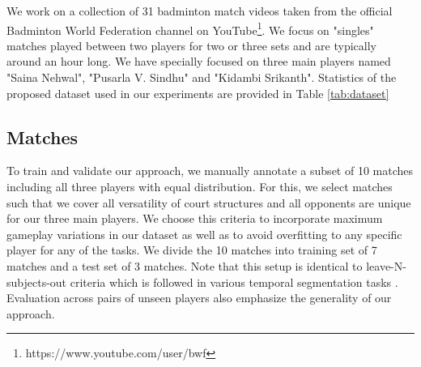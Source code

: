 \documentclass[runningheads,a4paper]{llncs}
\begin{document}
We work on a collection of 31 badminton match videos
taken from the official Badminton World Federation channel on YouTube\footnote{https://www.youtube.com/user/bwf}. We focus on "singles" matches played between two players for two or three sets and are typically around an hour long. We have specially focused on three main players named "Saina Nehwal", "Pusarla V. Sindhu" and "Kidambi Srikanth". Statistics of the proposed dataset used in our experiments are provided in Table \ref{tab:dataset}
\begin{table}[]
\centering
{}
\caption{Various statistics of our Badminton BWF Dataset. Each match is typically one hour long. Train and test columns represents number of annotations used in respective split for experiments.}
\label{tab:dataset}
\end{table}

\subsection{Matches}

To train and validate our approach, we manually annotate a subset of 10 matches including all three players with equal distribution. For this, we select matches such that we cover all versatility of court structures and all opponents are unique for our three main players. We choose this criteria to incorporate maximum gameplay variations in our dataset as well as to avoid overfitting to any specific player for any of the tasks. We divide the 10 matches into training set of 7 matches and a test set of 3 matches. Note that this setup is identical to leave-N-subjects-out criteria which is followed in various temporal segmentation tasks \cite{fathi2011learning, singh2016first, stein2013combining}. Evaluation across pairs of unseen players also emphasize the generality of our approach.
\end{document}
